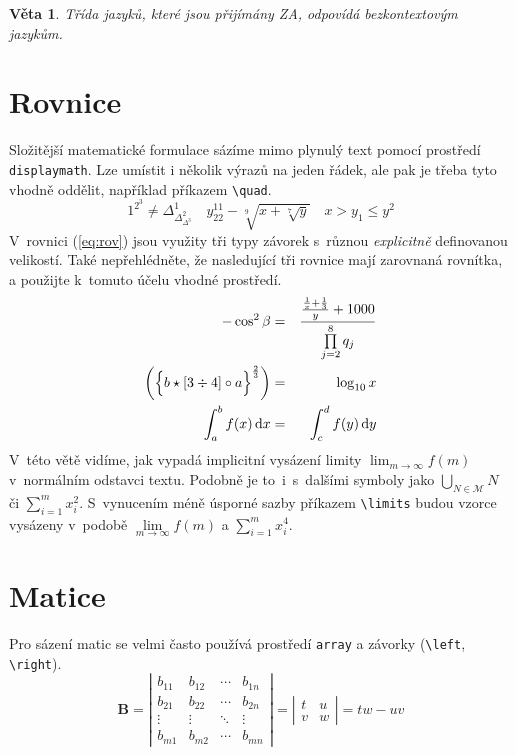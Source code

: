 \documentclass[a4paper, twocolumn, 11pt]{article}
\theoremstyle{plain}
\newtheorem{theorem}{Věta}
\begin{document}
\begin{theorem}

	Třída jazyků, které jsou přijímány ZA, odpovídá \emph{bezkontextovým jazykům.}

\end{theorem}

\section{Rovnice}

Složitější matematické formulace sázíme mimo plynulý text pomocí prostředí \texttt{displaymath}.
Lze umístit i několik výrazů na jeden řádek, ale pak je třeba tyto vhodně oddělit,
například příkazem \verb|\quad|.
%
\begin{displaymath}
	1^{2^3} \neq \Delta^1_{\Delta^2_{\Delta^3}} \quad
	y_{22}^{11} - \sqrt[9]{x + \sqrt[7]{y}} \quad
	x > y_1 \leq y^2
\end{displaymath}
%
\noindent
V~rovnici (\ref{eq:rov}) jsou využity tři typy závorek s~různou \emph{explicitně} definovanou velikostí.
Také nepřehlédněte, že nasledující tři rovnice mají zarovnaná rovnítka, a použijte k~tomuto účelu
vhodné prostředí.
%
\begin{eqnarray}
	- \cos^2 \beta &=& \frac{\frac{\frac{1}{x} + \frac{1}{3}}{y} + 1000}{\prod\limits_{j=2}^8 q_j} \\
	\label{eq:rov} \biggl( {\Bigl\{ b \star \left[ 3 \div 4 \right] \circ a \Bigr\}}^{\frac{2}{3}} \biggr) &=& \log_{10} x \\
	\int_{a}^{b} f(x) \, \mathrm{d}x &=& \int_{c}^{d} f(y) \, \mathrm{d}y
\end{eqnarray}
%
\noindent
V~této větě vidíme, jak vypadá implicitní vysázení limity $\lim_{m\to\infty}f(m)$
v~normálním odstavci textu. Podobně je to~i~s~dalšími symboly jako
$\bigcup_{N \in \mathcal{M}} N$ či $\sum_{i=1}^{m} x_{i}^{2}$.
S~vynucením méně úsporné sazby příkazem \verb|\limits| budou vzorce vysázeny v~podobě
$\lim\limits_{m\to\infty} f(m)$ a $\sum\limits_{i=1}^{m} x_{i}^{4}$.

\section{Matice}

Pro sázení matic se velmi často používá prostředí \texttt{array}
a závorky (\verb|\left|, \verb|\right|).
%
\begin{displaymath}
	\mathbf{B} = \left| \begin{array}{cccc}
		b_{11} & b_{12} & \cdots & b_{1n} \\
		b_{21} & b_{22} & \cdots & b_{2n} \\
		\vdots & \vdots & \ddots & \vdots \\
		b_{m1} & b_{m2} & \cdots & b_{mn}
	\end{array} \right|
	= \left| \begin{array}{cc}
		t & u \\
		v & w
	\end{array} \right|
	= tw - uv
\end{displaymath}
\end{document}
